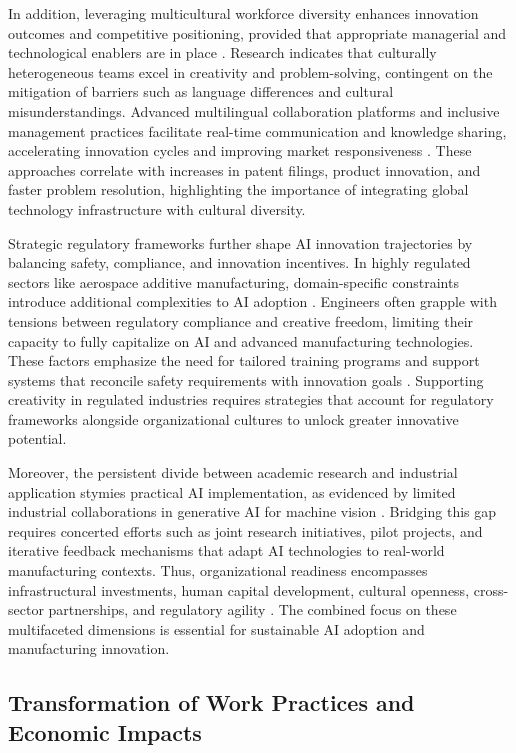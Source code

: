 \documentclass[sigconf]{acmart}
\begin{document}
In addition, leveraging multicultural workforce diversity enhances innovation outcomes and competitive positioning, provided that appropriate managerial and technological enablers are in place \cite{ref16}. Research indicates that culturally heterogeneous teams excel in creativity and problem-solving, contingent on the mitigation of barriers such as language differences and cultural misunderstandings. Advanced multilingual collaboration platforms and inclusive management practices facilitate real-time communication and knowledge sharing, accelerating innovation cycles and improving market responsiveness \cite{ref17,ref19}. These approaches correlate with increases in patent filings, product innovation, and faster problem resolution, highlighting the importance of integrating global technology infrastructure with cultural diversity.

Strategic regulatory frameworks further shape AI innovation trajectories by balancing safety, compliance, and innovation incentives. In highly regulated sectors like aerospace additive manufacturing, domain-specific constraints introduce additional complexities to AI adoption \cite{ref16}. Engineers often grapple with tensions between regulatory compliance and creative freedom, limiting their capacity to fully capitalize on AI and advanced manufacturing technologies. These factors emphasize the need for tailored training programs and support systems that reconcile safety requirements with innovation goals \cite{ref9}. Supporting creativity in regulated industries requires strategies that account for regulatory frameworks alongside organizational cultures to unlock greater innovative potential.

Moreover, the persistent divide between academic research and industrial application stymies practical AI implementation, as evidenced by limited industrial collaborations in generative AI for machine vision \cite{ref3}. Bridging this gap requires concerted efforts such as joint research initiatives, pilot projects, and iterative feedback mechanisms that adapt AI technologies to real-world manufacturing contexts. Thus, organizational readiness encompasses infrastructural investments, human capital development, cultural openness, cross-sector partnerships, and regulatory agility \cite{ref36}. The combined focus on these multifaceted dimensions is essential for sustainable AI adoption and manufacturing innovation.

\subsection{Transformation of Work Practices and Economic Impacts}
\end{document}

